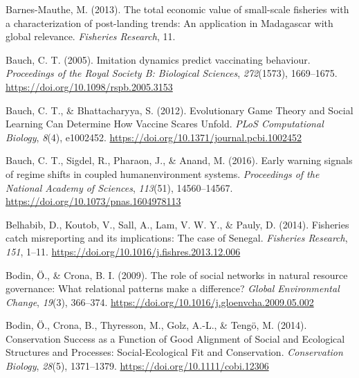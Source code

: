 \documentclass[
  12pt,
]{article}
\newlength{\cslhangindent}
\newlength{\cslentryspacingunit} %
\newenvironment{CSLReferences}[2] %
 {%
  \setlength{\parindent}{0pt}
  \ifodd #1
  \let\oldpar\par
  \def\par{\hangindent=\cslhangindent\oldpar}
  \fi
  \setlength{\parskip}{#2\cslentryspacingunit}
 }%
 {}
\begin{document}
\begin{CSLReferences}{1}{2}
\leavevmode{}%
Barnes-Mauthe, M. (2013). The total economic value of small-scale fisheries with a characterization of post-landing trends: {An} application in {Madagascar} with global relevance. \emph{Fisheries Research}, 11.

\leavevmode{}%
Bauch, C. T. (2005). Imitation dynamics predict vaccinating behaviour. \emph{Proceedings of the Royal Society B: Biological Sciences}, \emph{272}(1573), 1669--1675. \url{https://doi.org/10.1098/rspb.2005.3153}

\leavevmode{}%
Bauch, C. T., \& Bhattacharyya, S. (2012). Evolutionary {Game Theory} and {Social Learning Can Determine How Vaccine Scares Unfold}. \emph{PLoS Computational Biology}, \emph{8}(4), e1002452. \url{https://doi.org/10.1371/journal.pcbi.1002452}

\leavevmode{}%
Bauch, C. T., Sigdel, R., Pharaon, J., \& Anand, M. (2016). Early warning signals of regime shifts in coupled human{\textendash}environment systems. \emph{Proceedings of the National Academy of Sciences}, \emph{113}(51), 14560--14567. \url{https://doi.org/10.1073/pnas.1604978113}

\leavevmode{}%
Belhabib, D., Koutob, V., Sall, A., Lam, V. W. Y., \& Pauly, D. (2014). Fisheries catch misreporting and its implications: {The} case of {Senegal}. \emph{Fisheries Research}, \emph{151}, 1--11. \url{https://doi.org/10.1016/j.fishres.2013.12.006}

\leavevmode{}%
Bodin, Ö., \& Crona, B. I. (2009). The role of social networks in natural resource governance: {What} relational patterns make a difference? \emph{Global Environmental Change}, \emph{19}(3), 366--374. \url{https://doi.org/10.1016/j.gloenvcha.2009.05.002}

\leavevmode{}%
Bodin, Ö., Crona, B., Thyresson, M., Golz, A.-L., \& Tengö, M. (2014). Conservation {Success} as a {Function} of {Good Alignment} of {Social} and {Ecological Structures} and {Processes}: {Social-Ecological Fit} and {Conservation}. \emph{Conservation Biology}, \emph{28}(5), 1371--1379. \url{https://doi.org/10.1111/cobi.12306}


\end{CSLReferences}
\end{document}

